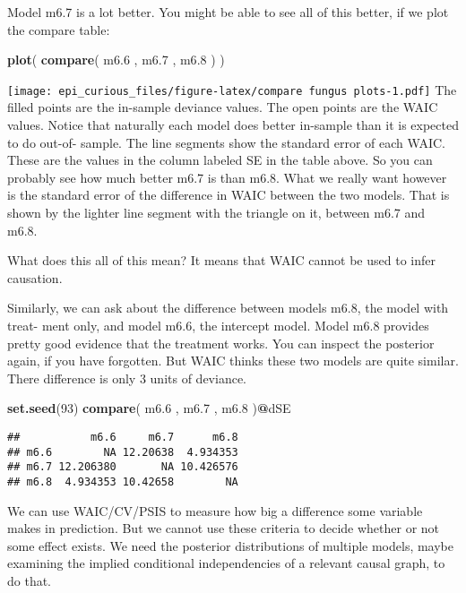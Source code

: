\documentclass[
]{article}
\newenvironment{Shaded}{\begin{snugshade}}{\end{snugshade}}
\newcommand{\DecValTok}[1]{\textcolor[rgb]{0.00,0.00,0.81}{#1}}
\newcommand{\FloatTok}[1]{\textcolor[rgb]{0.00,0.00,0.81}{#1}}
\newcommand{\KeywordTok}[1]{\textcolor[rgb]{0.13,0.29,0.53}{\textbf{#1}}}
\newcommand{\NormalTok}[1]{#1}
\newcommand{\OperatorTok}[1]{\textcolor[rgb]{0.81,0.36,0.00}{\textbf{#1}}}
\begin{document}
Model m6.7 is a lot better. You might be able to see all of this better,
if we plot the compare table:

\begin{Shaded}
\begin{Highlighting}[]
 \KeywordTok{plot}\NormalTok{( }\KeywordTok{compare}\NormalTok{( m6}\FloatTok{.6}\NormalTok{ , m6}\FloatTok{.7}\NormalTok{ , m6}\FloatTok{.8}\NormalTok{ ) )}
\end{Highlighting}
\end{Shaded}

\texttt{[image: epi\_curious\_files/figure-latex/compare fungus plots-1.pdf]}
The filled points are the in-sample deviance values. The open points are
the WAIC values. Notice that naturally each model does better in-sample
than it is expected to do out-of- sample. The line segments show the
standard error of each WAIC. These are the values in the column labeled
SE in the table above. So you can probably see how much better m6.7 is
than m6.8. What we really want however is the standard error of the
difference in WAIC between the two models. That is shown by the lighter
line segment with the triangle on it, between m6.7 and m6.8.

What does this all of this mean? It means that WAIC cannot be used to
infer causation.

Similarly, we can ask about the difference between models m6.8, the
model with treat- ment only, and model m6.6, the intercept model. Model
m6.8 provides pretty good evidence that the treatment works. You can
inspect the posterior again, if you have forgotten. But WAIC thinks
these two models are quite similar. There difference is only 3 units of
deviance.

\begin{Shaded}
\begin{Highlighting}[]
\KeywordTok{set.seed}\NormalTok{(}\DecValTok{93}\NormalTok{)}
\KeywordTok{compare}\NormalTok{( m6}\FloatTok{.6}\NormalTok{ , m6}\FloatTok{.7}\NormalTok{ , m6}\FloatTok{.8}\NormalTok{ )}\OperatorTok{@}\NormalTok{dSE}
\end{Highlighting}
\end{Shaded}

\begin{verbatim}
##           m6.6     m6.7      m6.8
## m6.6        NA 12.20638  4.934353
## m6.7 12.206380       NA 10.426576
## m6.8  4.934353 10.42658        NA
\end{verbatim}

We can use WAIC/CV/PSIS to measure how big a difference some variable
makes in prediction. But we cannot use these criteria to decide whether
or not some effect exists. We need the posterior distributions of
multiple models, maybe examining the implied conditional independencies
of a relevant causal graph, to do that.
\end{document}
